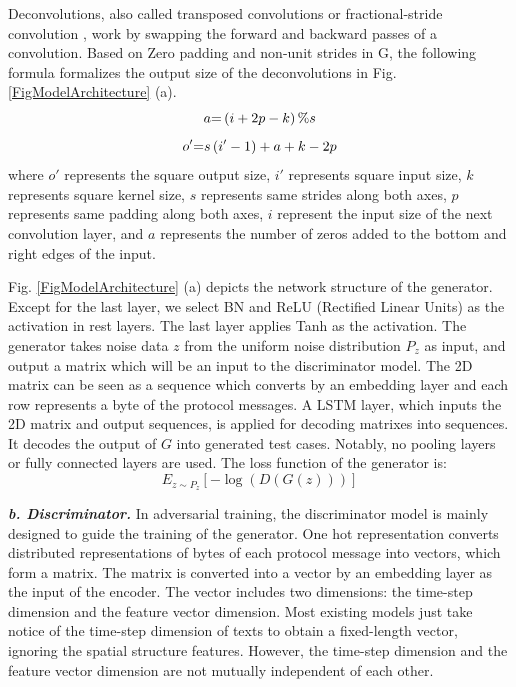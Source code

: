 Deconvolutions, also called transposed convolutions or fractional-stride convolution \cite{dumoulin2016guide}, work by swapping the forward and backward passes of a convolution.  Based on Zero padding and non-unit strides in G, the following formula formalizes the output size of the deconvolutions in Fig. \ref{FigModelArchitecture} (a).
\begin{equation}
a{\rm{ = }}\left( {i + 2p - k} \right) \%  s 
\end{equation}
\begin{equation}
o'{\rm{ = }}s\left( {i' - 1} \right)  + a + k - 2p
\end{equation}
where $o'$ represents the square output size, $i'$ represents square input size, $k$ represents square kernel size, $s$ represents same strides along both axes, $p$ represents same padding along both axes, $i$ represent the input size of the next convolution layer, and $a$ represents the number of zeros added to the bottom and right edges of the input.

Fig. \ref{FigModelArchitecture} (a) depicts the network structure of the generator. Except for the last layer, we select BN and ReLU (Rectified Linear Units) as the activation in rest layers. The last layer applies Tanh as the activation. The generator takes noise data $z$ from the uniform noise distribution ${P}_{z}$ as input, and output a matrix which will be an input to the discriminator model. The 2D matrix can be seen as a sequence which converts by an embedding layer and each row represents a byte of the protocol messages. A LSTM layer, which inputs the 2D matrix and output sequences, is applied for decoding matrixes into sequences. It decodes the output of $G$ into generated test cases.
Notably, no pooling layers or fully connected layers are used. The loss function of the generator is:
\begin{equation}
{{E}_{z\sim{{P}_{z}}}}\left[ -\log (D(G(z))) \right]
\end{equation}


\quad \textit{\textbf{b. Discriminator.}} In adversarial training, the discriminator model is mainly designed to guide the training of the generator. One hot representation converts distributed representations of bytes of each protocol message into vectors, which form a matrix. The matrix is converted into a vector by an embedding layer as the input of the encoder. The vector includes two dimensions: the time-step dimension and the feature vector dimension. Most existing models just take notice of the time-step dimension of texts to obtain a fixed-length vector, ignoring the spatial structure features. However, the time-step dimension and the feature vector dimension are not mutually independent of each other. 

